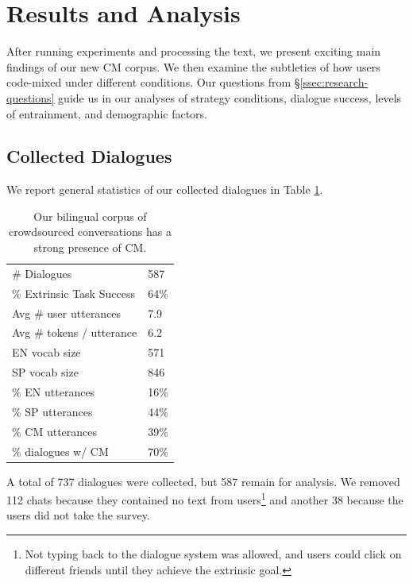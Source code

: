 \documentclass[11pt,a4paper]{article}
\newcommand{\Sref}[1]{\S\ref{#1}}
\begin{document}
\section{Results and Analysis}
\label{sec:results}

After running experiments and processing the text, we present exciting main findings of our new CM corpus.
We then examine the subtleties of how users code-mixed under different conditions.
Our questions from \Sref{ssec:research-questions} guide us in our analyses of strategy conditions, dialogue success, levels of entrainment, and demographic factors.

\subsection{Collected Dialogues}
We report general statistics of our collected dialogues in Table \ref{tab:overview-stats}.

\begin{table}[]
\centering
\begin{tabular}{ll}  %
\hline
\# Dialogues                     & 587    \\
\% Extrinsic Task Success        & 64\%   \\
Avg \# user utterances           & 7.9   \\
Avg \# tokens / utterance        & 6.2   \\
EN vocab size                    & 571    \\
SP vocab size                    &  846    \\
\% EN utterances                 & 16\%   \\
\% SP utterances                 & 44\%   \\
\% CM utterances                 & 39\%   \\
\% dialogues w/ CM               & 70\% \\
\hline
\end{tabular}
\caption{Our bilingual corpus of crowdsourced conversations has a strong presence of CM.}
\label{tab:overview-stats}
\end{table}

A total of 737 dialogues were collected, but 587 remain for analysis. We removed 112 chats because they contained no text from users\footnote{Not typing back to the dialogue system was allowed, and users could click on different friends until they achieve the extrinsic goal.} and another 38 because the users did not take the survey.
\end{document}
